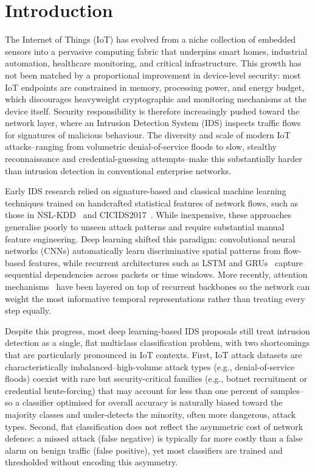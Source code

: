 \documentclass{llncs}
\begin{document}
\section{Introduction}
\label{sec:intro}

The Internet of Things (IoT) has evolved from a niche collection of embedded sensors into a pervasive computing fabric that underpins smart homes, industrial automation, healthcare monitoring, and critical infrastructure. This growth has not been matched by a proportional improvement in device-level security: most IoT endpoints are constrained in memory, processing power, and energy budget, which discourages heavyweight cryptographic and monitoring mechanisms at the device itself. Security responsibility is therefore increasingly pushed toward the network layer, where an Intrusion Detection System (IDS) inspects traffic flows for signatures of malicious behaviour. The diversity and scale of modern IoT attacks--ranging from volumetric denial-of-service floods to slow, stealthy reconnaissance and credential-guessing attempts--make this substantially harder than intrusion detection in conventional enterprise networks.

Early IDS research relied on signature-based and classical machine learning techniques trained on handcrafted statistical features of network flows, such as those in NSL-KDD~\cite{ref17} and CICIDS2017~\cite{ref18}. While inexpensive, these approaches generalise poorly to unseen attack patterns and require substantial manual feature engineering. Deep learning shifted this paradigm: convolutional neural networks (CNNs) automatically learn discriminative spatial patterns from flow-based features, while recurrent architectures such as LSTM and GRUs~\cite{ref12} capture sequential dependencies across packets or time windows. More recently, attention mechanisms~\cite{ref13} have been layered on top of recurrent backbones so the network can weight the most informative temporal representations rather than treating every step equally.

Despite this progress, most deep learning-based IDS proposals still treat intrusion detection as a single, flat multiclass classification problem, with two shortcomings that are particularly pronounced in IoT contexts. First, IoT attack datasets are characteristically imbalanced--high-volume attack types (e.g., denial-of-service floods) coexist with rare but security-critical families (e.g., botnet recruitment or credential brute-forcing) that may account for less than one percent of samples--so a classifier optimised for overall accuracy is naturally biased toward the majority classes and under-detects the minority, often more dangerous, attack types. Second, flat classification does not reflect the asymmetric cost of network defence: a missed attack (false negative) is typically far more costly than a false alarm on benign traffic (false positive), yet most classifiers are trained and thresholded without encoding this asymmetry.
\end{document}
